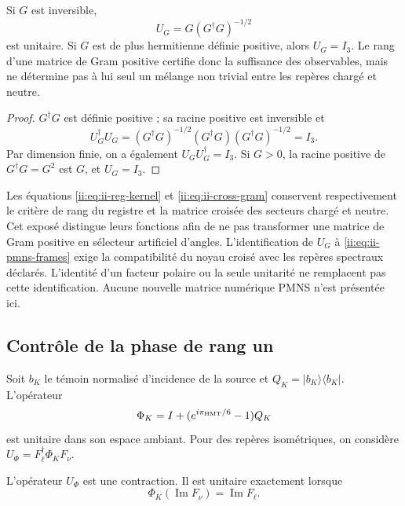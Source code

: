 \begin{proposition}
Si \(G\) est inversible,
\begin{equation}
 U_G=G(G^\dagger G)^{-1/2}
 \label{ii:eq:ii-polar}
\end{equation}
est unitaire. Si \(G\) est de plus hermitienne définie positive, alors
\(U_G=I_3\). Le rang d'une matrice de Gram positive certifie donc
la suffisance des observables, mais ne détermine pas à lui seul un
mélange non trivial entre les repères chargé et neutre.
\end{proposition}

\begin{proof}
\(G^\dagger G\) est définie positive ; sa racine positive est inversible et
\[
 U_G^\dagger U_G=(G^\dagger G)^{-1/2}(G^\dagger G)
 (G^\dagger G)^{-1/2}=I_3.
\]
Par dimension finie, on a également
\(U_GU_G^\dagger=I_3\). Si \(G>0\), la racine positive de
\(G^\dagger G=G^2\) est \(G\), et \(U_G=I_3\).
\end{proof}

\begin{remark}
Les équations \eqref{ii:eq:ii-reg-kernel} et \eqref{ii:eq:ii-cross-gram} conservent respectivement le critère de rang du registre et la matrice croisée des secteurs chargé et neutre. Cet exposé distingue leurs fonctions afin de ne pas transformer une matrice de Gram positive en sélecteur artificiel d’angles. L’identification de \(U_G\) à \eqref{ii:eq:ii-pmns-frames} exige la compatibilité du noyau croisé avec les repères spectraux déclarés. L’identité d’un facteur polaire ou la seule unitarité ne remplacent pas cette identification. Aucune nouvelle matrice numérique PMNS n’est présentée ici.
\end{remark}

\subsection{Contrôle de la phase de rang un}

Soit \(b_K\) le témoin normalisé d'incidence de la source et
\(Q_K=|b_K\rangle\langle b_K|\). L'opérateur
\begin{equation}
 \Phi_K=I+(e^{i\pi_{\rm HMT}/6}-1)Q_K
 \label{ii:eq:ii-rank-one-phase}
\end{equation}
est unitaire dans son espace ambiant. Pour des repères isométriques, on considère
\(U_\Phi=F_\ell^\dagger\Phi_KF_\nu\).

\begin{proposition}
L'opérateur \(U_\Phi\) est une contraction. Il est unitaire exactement
lorsque
\begin{equation}
 \Phi_K(\operatorname{Im}F_\nu)=\operatorname{Im}F_\ell.
 \label{ii:eq:ii-phase-compatibility}
\end{equation}
\end{proposition}

